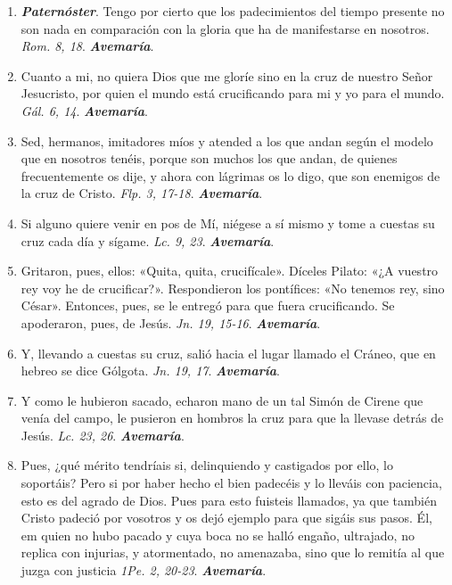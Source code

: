 \documentclass[11pt,a4paper]{book}
\begin{document}
    \begin{enumerate}
        \item \textbf{\emph{Paternóster}}. Tengo por cierto que los padecimientos del tiempo presente no son nada en comparación con la gloria que ha
            de manifestarse en nosotros. \emph{Rom. 8, 18}. \textbf{\emph{Avemaría}}.

        \item Cuanto a mi, no quiera Dios que me gloríe sino en la cruz de nuestro Señor Jesucristo, por quien el mundo está crucificando
            para mi y yo para el mundo. \emph{Gál. 6, 14}. \textbf{\emph{Avemaría}}.

        \item Sed, hermanos, imitadores míos y atended a los que andan según el modelo que en nosotros tenéis, porque son muchos los que andan, de quienes frecuentemente
            os dije, y ahora con lágrimas os lo digo, que son enemigos de la cruz de Cristo. \emph{Flp. 3, 17-18}. \textbf{\emph{Avemaría}}.

        \item Si alguno quiere venir en pos de Mí, niégese a sí mismo y tome a cuestas su cruz cada día y sígame. \emph{Lc. 9, 23}. \textbf{\emph{Avemaría}}.

        \item Gritaron, pues, ellos: «Quita, quita, crucifícale». Díceles Pilato: «¿A vuestro rey voy he de crucificar?». 
            Respondieron los pontífices: «No tenemos rey, sino César». Entonces, pues, se le entregó para que fuera crucificando. 
            Se apoderaron, pues, de Jesús. \emph{Jn. 19, 15-16}. \textbf{\emph{Avemaría}}.

        \item Y, llevando a cuestas su cruz, salió hacia el lugar llamado el Cráneo, que en hebreo se dice Gólgota. \emph{Jn. 19, 17}. \textbf{\emph{Avemaría}}.

        \item Y como le hubieron sacado, echaron mano de un tal Simón de Cirene que venía del campo, le pusieron en hombros la cruz para que la llevase detrás de Jesús. 
            \emph{Lc. 23, 26}. \textbf{\emph{Avemaría}}.

        \item Pues, ¿qué mérito tendríais si, delinquiendo y castigados por ello, lo soportáis? Pero si por haber hecho el bien padecéis y lo lleváis con paciencia, 
            esto es del agrado de Dios. Pues para esto fuisteis llamados, ya que también Cristo padeció por vosotros y os dejó ejemplo para que sigáis sus pasos. Él,
            em quien no hubo pacado y cuya boca no se halló engaño, ultrajado, no replica con injurias, y atormentado, no amenazaba, sino que lo remitía al que juzga 
            con justicia \emph{1Pe. 2, 20-23}. \textbf{\emph{Avemaría}}.            


\end{enumerate}
\end{document}
